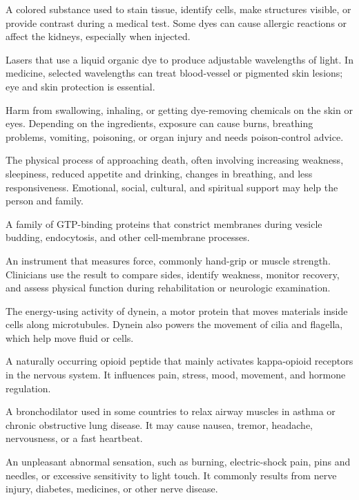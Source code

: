  A colored substance used to stain tissue, identify cells, make structures visible, or provide contrast during a medical test. Some dyes can cause allergic reactions or affect the kidneys, especially when injected.

 Lasers that use a liquid organic dye to produce adjustable wavelengths of light. In medicine, selected wavelengths can treat blood-vessel or pigmented skin lesions; eye and skin protection is essential.

 Harm from swallowing, inhaling, or getting dye-removing chemicals on the skin or eyes. Depending on the ingredients, exposure can cause burns, breathing problems, vomiting, poisoning, or organ injury and needs poison-control advice.

 The physical process of approaching death, often involving increasing weakness, sleepiness, reduced appetite and drinking, changes in breathing, and less responsiveness. Emotional, social, cultural, and spiritual support may help the person and family.

 A family of GTP-binding proteins that constrict membranes during vesicle budding, endocytosis, and other cell-membrane processes.

 An instrument that measures force, commonly hand-grip or muscle strength. Clinicians use the result to compare sides, identify weakness, monitor recovery, and assess physical function during rehabilitation or neurologic examination.

 The energy-using activity of dynein, a motor protein that moves materials inside cells along microtubules. Dynein also powers the movement of cilia and flagella, which help move fluid or cells.

 A naturally occurring opioid peptide that mainly activates kappa-opioid receptors in the nervous system. It influences pain, stress, mood, movement, and hormone regulation.

 A bronchodilator used in some countries to relax airway muscles in asthma or chronic obstructive lung disease. It may cause nausea, tremor, headache, nervousness, or a fast heartbeat.

 An unpleasant abnormal sensation, such as burning, electric-shock pain, pins and needles, or excessive sensitivity to light touch. It commonly results from nerve injury, diabetes, medicines, or other nerve disease.

